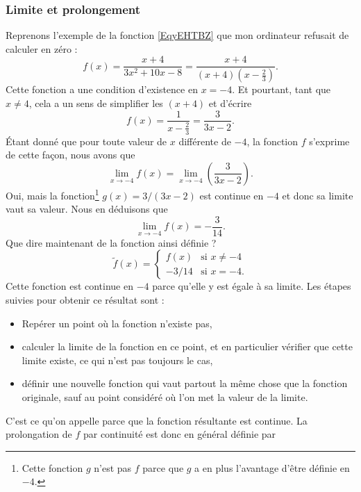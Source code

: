 \subsubsection{Limite et prolongement}

Reprenons l'exemple de la fonction \eqref{EqyEHTBZ} que mon ordinateur refusait de calculer en zéro :
\begin{equation}
	f(x)=\frac{ x+4 }{ 3x^2+10x-8 }=\frac{ x+4 }{ (x+4)\left( x-\frac{ 2 }{ 3 } \right) }.
\end{equation}
Cette fonction a une condition d'existence en $x=-4$. Et pourtant, tant que $x\neq 4$, cela a un sens de simplifier les $(x+4)$ et d'écrire
\[
	f(x)=\frac{ 1 }{ x-\frac{ 2 }{ 3 } }=\frac{ 3 }{ 3x-2 }.
\]
Étant donné que pour toute valeur de $x$ différente de $-4$, la fonction $f$ s'exprime de cette façon, nous avons que
\[
	\lim_{x\to -4}f(x)=\lim_{x\to -4}\left(\frac{ 3 }{ 3x-2 }\right).
\]
Oui, mais la fonction\footnote{Cette fonction $g$ n'est pas $f$ parce que $g$ a en plus l'avantage d'être définie en $-4$.} $g(x)=3/(3x-2)$ est continue en $-4$ et donc sa limite vaut sa valeur. Nous en déduisons que
\[
	\lim_{x\to -4}f(x)=-\frac{ 3 }{ 14 }.
\]
Que dire maintenant de la fonction ainsi définie ?
\begin{equation}
	\tilde f(x)=
	\begin{cases}
		f(x)  & \text{si }x\neq -4 \\
		-3/14 & \text{si }x=-4.
	\end{cases}
\end{equation}
Cette fonction est continue en $-4$ parce qu'elle y est égale à sa limite. Les étapes suivies pour obtenir ce résultat sont :
\begin{itemize}
	\item Repérer un point où la fonction n'existe pas,
	\item calculer la limite de la fonction en ce point, et en particulier vérifier que cette limite existe, ce qui n'est pas toujours le cas,
	\item définir une nouvelle fonction qui vaut partout la même chose que la fonction originale, sauf au point considéré où l'on met la valeur de la limite.
\end{itemize}
C'est ce qu'on appelle  parce que la fonction résultante est continue. La prolongation de $f$ par continuité est donc en général définie par
